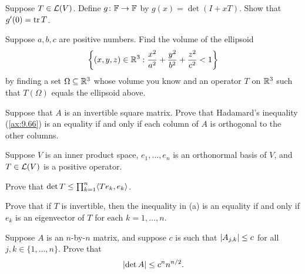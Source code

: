 \begin{exercise}
Suppose $T\in\mathcal{L}(V)$. Define $g\colon\mathbb{F}\to\mathbb{F}$ by $g(x)=\det(I+xT)$. Show that
$g'(0)=\operatorname{tr} T$.
\end{exercise}

\begin{exercise}
Suppose $a,b,c$ are positive numbers. Find the volume of the ellipsoid
\[ \biggl\{(x,y,z)\in\mathbb{R}^3 : \frac{x^2}{a^2}+\frac{y^2}{b^2}+\frac{z^2}{c^2}<1
   \biggr\} \]
by finding a set $\Omega\subseteq\mathbb{R}^3$ whose volume you know and an operator
$T$ on $\mathbb{R}^3$ such that $T(\Omega)$ equals the ellipsoid above.
\end{exercise}

\begin{exercise}
Suppose that $A$ is an invertible square matrix. Prove that Hadamard's
inequality (\ref{ax:9.66}) is an equality if and only if each column of $A$ is
orthogonal to the other columns.
\end{exercise}

\begin{exercise}
Suppose $V$ is an inner product space, $e_1,\dots,e_n$ is an orthonormal basis
of $V$, and $T\in\mathcal{L}(V)$ is a positive operator.
\begin{parts}
\item Prove that $\operatorname{det} T\le\prod_{k=1}^n\langle Te_k, e_k \rangle$.
\item Prove that if $T$ is invertible, then the inequality in (a) is an equality
  if and only if $e_k$ is an eigenvector of $T$ for each $k=1,\dots,n$.
\end{parts}
\end{exercise}

\begin{exercise}
Suppose $A$ is an $n$-by-$n$ matrix, and suppose $c$ is such that
$\lvert A_{j,k} \rvert\le c$ for all $j,k\in\{1,\dots,n\}$. Prove that
\[ \lvert \operatorname{det} A \rvert \le c^nn^{n/2}. \]
\end{exercise}

